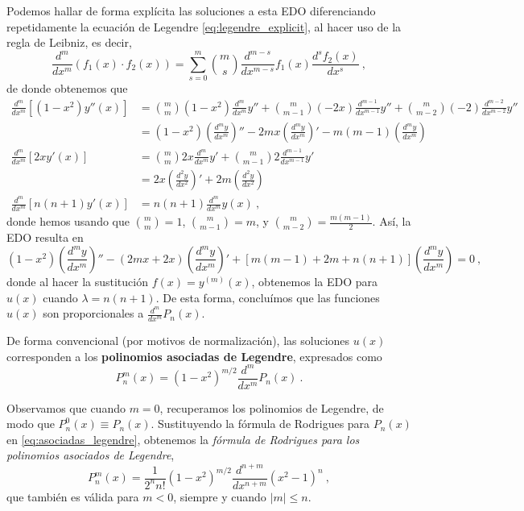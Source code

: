 Podemos hallar de forma explícita las soluciones a esta EDO diferenciando repetidamente la ecuación de Legendre \eqref{eq:legendre_explicit}, al hacer uso de la regla de Leibniz, es decir,
\begin{equation}
    \frac{d^m}{dx^m}\left( f_1(x) \cdot f_2(x) \right) = \sum_{s=0}^{m} \binom{m}{s} \frac{d^{m-s}}{dx^{m-s}}f_1(x) \frac{d^s f_2(x)}{dx^s} \ ,
\end{equation}
de donde obtenemos que
\begin{align*}
    \frac{d^m}{dx^m}\left[ (1-x^2)y''(x) \right] & = \binom{m}{m} (1-x^2) \frac{d^m }{dx^m}y'' + \binom{m}{m-1} (-2x) \frac{d^{m-1}}{dx^{m-1}} y'' + \binom{m}{m-2} (-2) \frac{d^{m-2}}{dx^{m-2}}y'' \\
    & = (1-x^2) \left(\frac{d^m y}{dx^m}\right)'' - 2mx \left(\frac{d^m y}{dx^m}\right)' - m(m-1)\left(\frac{d^m y}{dx^m}\right)  \\
    \frac{d^m}{dx^m}\left[ 2x y'(x) \right] & = \binom{m}{m} 2x \frac{d^m}{dx^m}y' + \binom{m}{m-1} 2 \frac{d^{m-1}}{dx^{m-1}}y' \\
    & = 2x \left(\frac{d^2 y}{dx^2}\right)' + 2m \left(\frac{d^2 y}{dx^2}\right) \\
    \frac{d^m}{dx^m}\left[ n(n+1)y'(x) \right] & = n(n+1) \frac{d^m}{dx^m}y(x) \ ,
\end{align*}
donde hemos usando que $\binom{m}{m} = 1$, $\binom{m}{m-1} = m$, y $\binom{m}{m-2} = \frac{m(m-1)}{2}$. Así, la EDO resulta en
\begin{equation}
    (1-x^2)\left(\frac{d^m y}{dx^m}\right)'' - (2mx + 2x) \left(\frac{d^m y}{dx^m}\right)' + [m(m-1) + 2m + n(n+1)]\left(\frac{d^m y}{dx^m}\right) = 0 \ ,
\end{equation}
donde al hacer la sustitución $f(x) = y^{(m)}(x)$, obtenemos la EDO para $u(x)$ cuando $\lambda = n(n+1)$. De esta forma, concluímos que las funciones $u(x)$ son proporcionales a $\frac{d^m }{dx^m} P_n(x)$.

De forma convencional (por motivos de normalización), las soluciones $u(x)$ corresponden a los \textbf{polinomios asociadas de Legendre}, expresados como
\begin{equation} \label{eq:asociadas_legendre}
    P_n^m(x) = (1-x^2)^{m/2} \frac{d^m}{dx^m}P_n(x) \ .
\end{equation}

Observamos que cuando $m=0$, recuperamos los polinomios de Legendre, de modo que $P^0_n(x) \equiv P_n(x)$. Sustituyendo la fórmula de Rodrigues para $P_n(x)$ en \eqref{eq:asociadas_legendre}, obtenemos la \emph{fórmula de Rodrigues para los polinomios asociados de Legendre},
\begin{equation} \label{eq:rodrigues-asociados}
    P_n^m(x) = \frac{1}{2^n n!}(1-x^2)^{m/2} \frac{d^{n+m}}{dx^{n+m}}(x^2-1)^n \ ,
\end{equation}
que también es válida para $m<0$, siempre y cuando $|m|\leq n$.

